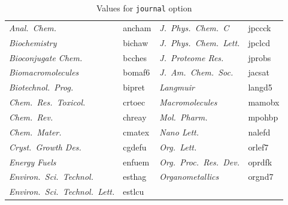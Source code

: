 \documentclass[english,journal=jctcce,manuscript=article,etalmode=truncate,maxauthors=0]{achemso}
\begin{document}
\begin{table}
\begin{tabular}{@{}>{\itshape}l>{\ttfamily}l>{\itshape}l>{\ttfamily}l@{}}
      Anal.\ Chem.                    & ancham &
      J.~Phys.\ Chem.~C               & jpccck \\
      Biochemistry                    & bichaw &
      J.~Phys.\ Chem.\ Lett.          & jpclcd \\
      Bioconjugate Chem.              & bcches &
      J.~Proteome Res.                & jprobs \\
      Biomacromolecules               & bomaf6 &
      J.~Am.\ Chem.\ Soc.             & jacsat \\
      Biotechnol.\ Prog.              & bipret &
      Langmuir                        & langd5 \\
      Chem.\ Res.\ Toxicol.           & crtoec &
      Macromolecules                  & mamobx \\
      Chem.\ Rev.                     & chreay &
      Mol.\ Pharm.                    & mpohbp \\
      Chem.\ Mater.                   & cmatex &
      Nano Lett.                      & nalefd \\
      Cryst.\ Growth Des.             & cgdefu &
      Org.\ Lett.                     & orlef7 \\
      Energy Fuels                    & enfuem &
      Org.\ Proc.\ Res.\ Dev.         & oprdfk \\
      Environ.\ Sci.\ Technol.        & esthag &
      Organometallics                 & orgnd7 \\
      Environ.\ Sci.\ Technol.\ Lett. & estlcu \\
    \bottomrule
  \end{tabular}
  \caption{Values for \texttt{journal} option}
  \label{tab:journal}
\end{table}

\end{document}
